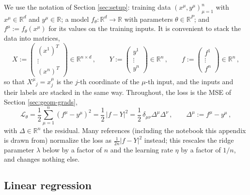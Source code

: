\documentclass[11pt]{article}
\newcommand{\R}{\mathbb{R}}
\newcommand{\CL}{{\mathcal L}}
\begin{document}
We use the notation of Section \ref{sec:setup}: training data $(x^\mu,y^\mu)_{\mu=1}^n$ with $x^\mu\in \R^d$ and $y^\mu\in\R$; a model $f_\theta:\R^d\to \R$ with parameters $\theta\in \R^P$; and $f^\mu := f_\theta(x^\mu)$ for its values on the training inputs. It is convenient to stack the data into matrices,
%
\begin{equation}
    X := \begin{pmatrix} (x^1)^T \\ \vdots \\ (x^n)^T \end{pmatrix} \in \R^{n\times d}\,,\qquad
    Y := \begin{pmatrix} y^1 \\ \vdots \\ y^n \end{pmatrix} \in \R^{n}\,,\qquad
    f := \begin{pmatrix} f^1 \\ \vdots \\ f^n \end{pmatrix} \in \R^{n}\,, \label{app-stack}
\end{equation}
%
so that $X^\mu{}_j = x^\mu_j$ is the $j$-th coordinate of the $\mu$-th input, and the inputs and their labels are stacked in the same way. Throughout, the loss is the MSE of Section \ref{sec:geom-grads},
%
\begin{equation}
    \CL_\theta = \frac{1}{2}\sum_{\mu=1}^n (f^\mu-y^\mu)^2 = \frac{1}{2}\,|f-Y|^2 = \frac{1}{2}\,\delta_{\mu\nu}\Delta^\mu\Delta^\nu\,,\qquad \Delta^\mu := f^\mu - y^\mu\,, \label{app-loss}
\end{equation}
%
with $\Delta\in\R^n$ the residual. Many references (including the notebook this appendix is drawn from) normalize the loss as $\frac{1}{2n}|f-Y|^2$ instead; this rescales the ridge parameter $\lambda$ below by a factor of $n$ and the learning rate $\eta$ by a factor of $1/n$, and changes nothing else.

\subsection{Linear regression}
\label{app:linreg}
\end{document}
